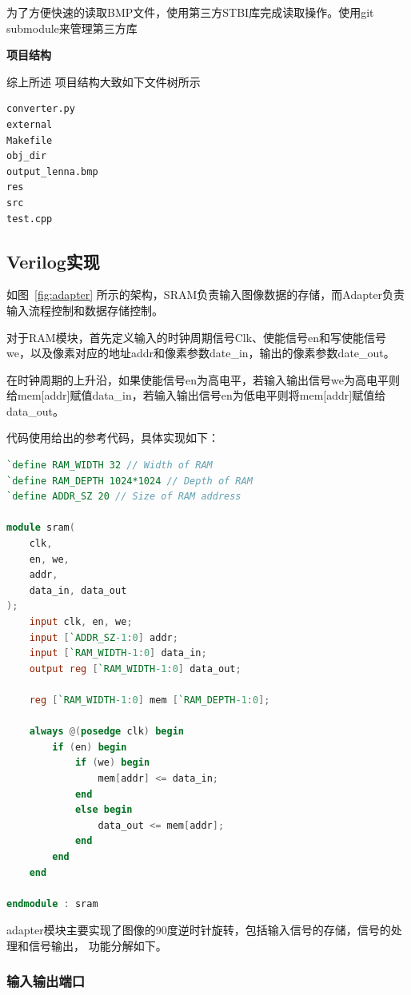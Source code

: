 \documentclass[12pt, a4paper]{article}
\begin{document}
为了方便快速的读取BMP文件，使用第三方STBI库完成读取操作。使用git submodule来管理第三方库

\noindent\textbf{项目结构}

综上所述 项目结构大致如下文件树所示

\begin{lstlisting}
converter.py 
external  
Makefile  
obj_dir   
output_lenna.bmp
res       
src       
test.cpp  
\end{lstlisting}


\subsection{Verilog实现}

如图~\ref{fig:adapter} 所示的架构，SRAM负责输入图像数据的存储，而Adapter负责输入流程控制和数据存储控制。

对于RAM模块，首先定义输入的时钟周期信号Clk、使能信号en和写使能信号we，以及像素对应的地址addr和像素参数date\_in，输出的像素参数date\_out。

在时钟周期的上升沿，如果使能信号en为高电平，若输入输出信号we为高电平则给mem[addr]赋值data\_in，若输入输出信号en为低电平则将mem[addr]赋值给data\_out。

代码使用给出的参考代码，具体实现如下：
\begin{lstlisting}[language=verilog]
`define RAM_WIDTH 32 // Width of RAM
`define RAM_DEPTH 1024*1024 // Depth of RAM
`define ADDR_SZ 20 // Size of RAM address

module sram(
    clk,
    en, we,
    addr,
    data_in, data_out
);
    input clk, en, we;
    input [`ADDR_SZ-1:0] addr;
    input [`RAM_WIDTH-1:0] data_in;
    output reg [`RAM_WIDTH-1:0] data_out;

    reg [`RAM_WIDTH-1:0] mem [`RAM_DEPTH-1:0];

    always @(posedge clk) begin
        if (en) begin
            if (we) begin
                mem[addr] <= data_in;
            end
            else begin
                data_out <= mem[addr];
            end
        end
    end

endmodule : sram
\end{lstlisting}

adapter模块主要实现了图像的90度逆时针旋转，包括输入信号的存储，信号的处理和信号输出，
功能分解如下。

\subsubsection{输入输出端口}
\end{document}
